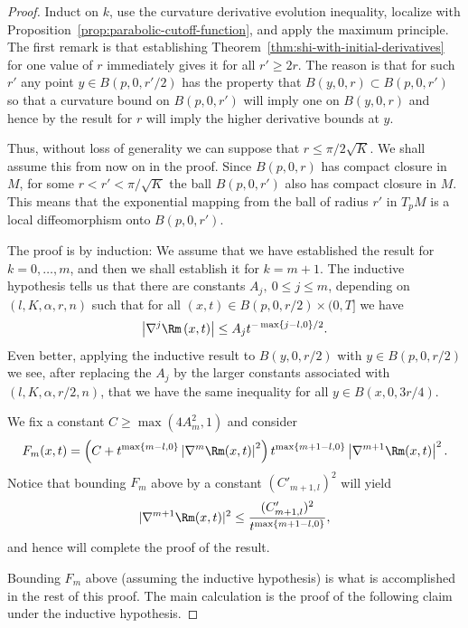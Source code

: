 \begin{proof}
\sketch Induct on $k$, use the curvature derivative evolution inequality,
localize with Proposition~\ref{prop:parabolic-cutoff-function}, and apply
the maximum principle.
The first remark is that establishing Theorem~\ref{thm:shi-with-initial-derivatives} for
one value of $r$ immediately gives it for all $r'\ge 2r$. The reason
is that for such $r'$ any point  $y\in B(p,0,r'/2)$ has the property
that $B(y,0,r)\subset B(p,0,r')$ so that a curvature bound on
$B(p,0,r')$ will imply one on $B(y,0,r)$ and hence by the result for
$r$ will imply the higher derivative bounds at $y$.


 Thus, without loss of
generality we can suppose that $r\le \pi/2\sqrt{K}$. We shall assume this
from now on in the proof. Since
$B(p,0,r)$ has compact closure in $M$, for some $r<r'<\pi/\sqrt{K}$
the ball $B(p,0,r')$ also has compact closure in $M$. This means
that the exponential mapping from the ball of radius $r'$ in $T_pM$
is a local diffeomorphism onto $B(p,0,r')$.

The proof is by induction: We assume that we have established the
result for $k=0,\ldots,m$, and then we shall establish it for
$k=m+1$. The inductive hypothesis tells us that there are constants
$A_j,\ 0\le j\le m$, depending on $(l,K,\alpha,r,n)$ such that for
all $(x,t)\in B(p,0,r/2)\times (0,T]$ we have
\begin{equation}\label{strongineq}
\left\vert \nabla^{j}\Rm \left(  x,t\right)
\right\vert \leq A_{j}t^{-\max\left\{  j-l,0\right\}  /2}.
\end{equation}
 Even better, applying the inductive result to $B(y,0,r/2)$ with
$y\in B(p,0,r/2)$ we see, after replacing the $A_j$ by the
larger constants associated with $(l,K,\alpha,r/2,n)$, that we have
the same inequality for all $y\in B(x,0,3r/4)$.


We fix a constant $C\geq \max(4A^2_m,1)$ and consider
\[
F_{m}(x,t)=\left(  C+t^{\max\left\{ m-l,0\right\} }  \left\vert \nabla
^{m}\Rm(x,t)\right\vert ^{2}\right)  t^{\max\left\{
m+1-l,0\right\}  }\left\vert
\nabla^{m+1}\Rm(x,t)\right\vert ^{2}.
\]
Notice that bounding $F_m$ above by a constant $(C'_{m+1,l})^2$ will
yield
$$|\nabla^{m+1}\Rm(x,t)|^2\le \frac{(C'_{m+1,l})^2}{t^{\max\{m+1-l,0\}}},$$
and hence will complete the proof of the result.

 Bounding $F_m$
above (assuming the inductive hypothesis) is what is accomplished in
the rest of this proof. The main calculation is the proof of the
following claim under the inductive hypothesis.
\end{proof}

